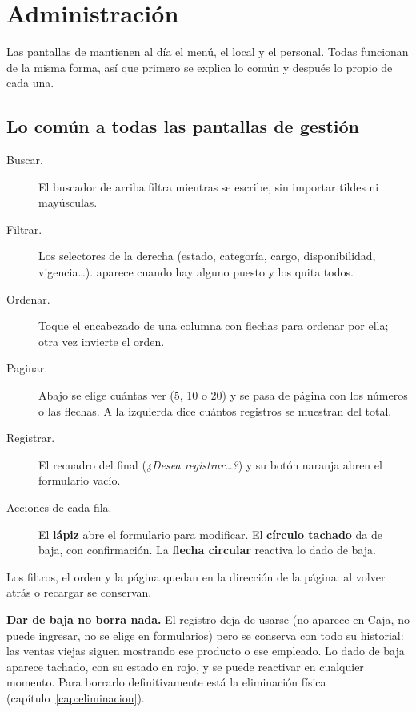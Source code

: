 \chapter{Administración}

Las pantallas de  mantienen al día el menú, el local y el personal. Todas funcionan de la misma forma, así que primero se explica lo común y después lo propio de cada una.

\section{Lo común a todas las pantallas de gestión}


\begin{description}
  \item[Buscar.] El buscador de arriba filtra mientras se escribe, sin importar tildes ni mayúsculas.
  \item[Filtrar.] Los selectores de la derecha (estado, categoría, cargo, disponibilidad, vigencia…).  aparece cuando hay alguno puesto y los quita todos.
  \item[Ordenar.] Toque el encabezado de una columna con flechas para ordenar por ella; otra vez invierte el orden.
  \item[Paginar.] Abajo se elige cuántas  ver (5, 10 o 20) y se pasa de página con los números o las flechas. A la izquierda dice cuántos registros se muestran del total.
  \item[Registrar.] El recuadro del final (\textit{¿Desea registrar…?}) y su botón naranja abren el formulario vacío.
  \item[Acciones de cada fila.] El \textbf{lápiz} abre el formulario para modificar. El \textbf{círculo tachado} da de baja, con confirmación. La \textbf{flecha circular} reactiva lo dado de baja.
\end{description}

Los filtros, el orden y la página quedan en la dirección de la página: al volver atrás o recargar se conservan.

\begin{consejo}
\textbf{Dar de baja no borra nada.} El registro deja de usarse (no aparece en Caja, no puede ingresar, no se elige en formularios) pero se conserva con todo su historial: las ventas viejas siguen mostrando ese producto o ese empleado. Lo dado de baja aparece tachado, con su estado en rojo, y se puede reactivar en cualquier momento. Para borrarlo definitivamente está la eliminación física (capítulo~\ref{cap:eliminacion}).
\end{consejo}

